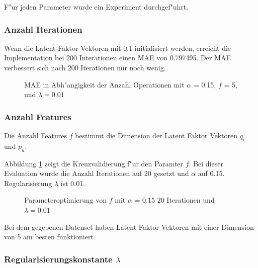 \documentclass[a4paper, 12pt]{article}
\begin{document}
F"ur jeden Parameter wurde ein Experiment durchgef"uhrt.

\subsubsection{Anzahl Iterationen}

Wenn die Latent Faktor Vektoren mit 0.1 initialisiert werden, erreicht die Implementation bei 200 Interationen einen MAE von 0.797495. Der MAE verbessert sich nach 200 Iterationen nur noch wenig.

\begin{figure}
  \centering
{}
\caption{MAE in Abh"angigkeit der Anzahl Operationen mit $\alpha$ = 0.15, $f$ = 5, und $\lambda=0.01$}
\end{figure}


\subsubsection{Anzahl Features}

Die Anzahl Features $f$ bestimmt die Dimension der Latent Faktor Vektoren $q_i$ und $p_u$.

Abbildung \ref{fig:lambda} zeigt die Kreuzvalidierung f"ur den Paramter $f$. Bei dieser Evaluation wurde die Anzahl Iterationen auf 20 gesetzt und $\alpha$ auf 0.15. Regularisierung $\lambda$ ist 0.01.

\begin{figure}
  \centering
{}
\label{fig:lambda}
\caption{Parameteroptimierung von $f$ mit $\alpha$ = 0.15 20 Iterationen und $\lambda=0.01$}
\end{figure}

Bei dem gegebenen Datenset haben Latent Faktor Vektoren mit einer Dimension von 5 am besten funktioniert.

\subsubsection{Regularisierungskonstante $\lambda$}
\end{document}

